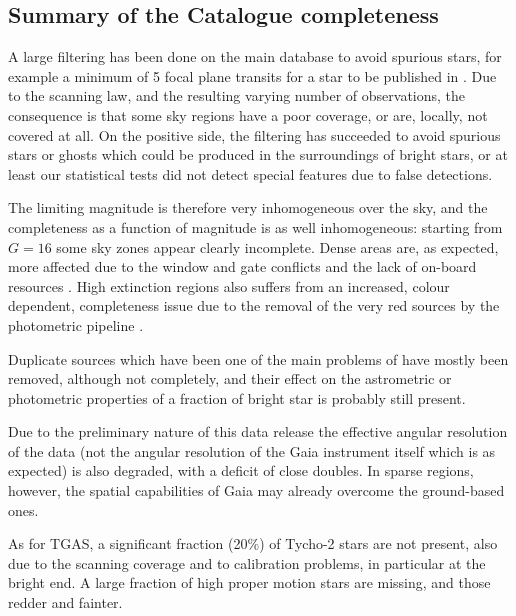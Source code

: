 

\subsection{Summary of the Catalogue completeness}\label{sec:summary-content}

A large filtering has been done on the main {\gaia} database to avoid spurious 
stars, for example a minimum of 5 focal plane transits for a star to be published 
in {}. Due to the scanning law, and the resulting varying number of observations, 
the consequence is that some sky regions have a poor coverage, or are, locally, 
not covered at all. On the positive side, the filtering has succeeded to avoid 
spurious stars or ghosts which could be produced in the surroundings of bright stars,
or at least our statistical tests did not detect special features due to false
detections.

The limiting magnitude is therefore very inhomogeneous over the sky,
and the completeness as a function of magnitude is as well inhomogeneous:
starting from $G=16$ some sky zones appear clearly incomplete. 
Dense areas are, as expected, more affected due to the window and gate conflicts and the lack of on-board resources \citep{DPACP-18}.
High extinction regions also suffers from an increased, colour dependent, 
completeness issue due to the removal of the very red sources by the photometric pipeline \citep{DPACP-12}.

Duplicate sources which have been one of the main problems of {} have mostly
been removed, although not completely, and their effect on the astrometric
or photometric properties of a fraction of bright star is probably still present.

Due to the preliminary nature of this data release the effective
angular resolution of the {} data (not the angular resolution of
the Gaia instrument itself which is as expected) is also degraded, with
a deficit of close doubles.  In sparse regions, however, the spatial
capabilities of Gaia may already overcome the ground-based ones.  

As for TGAS, a significant fraction (20\%) of Tycho-2 stars are not present,
also due to the scanning coverage and to calibration problems, in particular at 
the bright end. A large fraction of high proper motion stars are missing, 
and those redder and fainter. 

